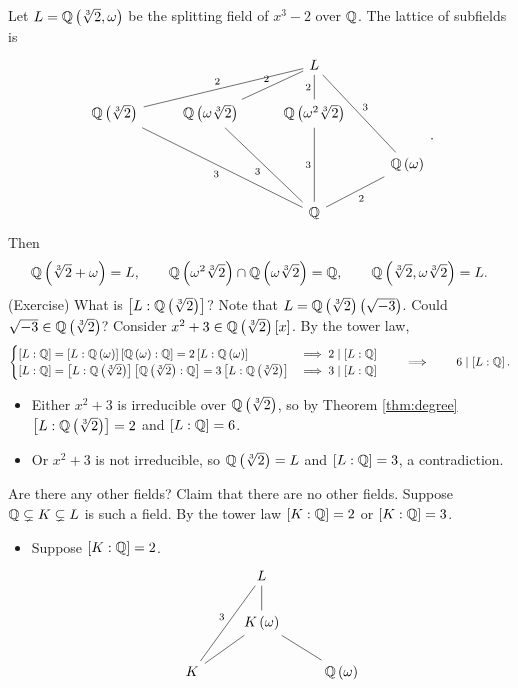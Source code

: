 \begin{example*}
Let $ L = \Q\rb{\sqrt[3]{2}, \omega} $ be the splitting field of $ x^3 - 2 $ over $ \Q $. The lattice of subfields is
$$
\begin{tikzcd}
& & L & \\
\Q\rb{\sqrt[3]{2}} \arrow[dash]{urr}{2} & \Q\rb{\omega\sqrt[3]{2}} \arrow[dash]{ur}{2} & \Q\rb{\omega^2\sqrt[3]{2}} \arrow[dash]{u}{2} & \\
& & & \Q\rb{\omega} \arrow[dash, swap]{uul}{3} \\
& & \Q \arrow[dash]{uull}{3} \arrow[dash]{uul}{3} \arrow[dash]{uu}{3} \arrow[dash, swap]{ur}{2} &
\end{tikzcd}.
$$
Then
$$ \Q\rb{\sqrt[3]{2} + \omega} = L, \qquad \Q\rb{\omega^2\sqrt[3]{2}} \cap \Q\rb{\omega\sqrt[3]{2}} = \Q, \qquad \Q\rb{\sqrt[3]{2}, \omega\sqrt[3]{2}} = L. $$
(Exercise) What is $ \sb{L : \Q\rb{\sqrt[3]{2}}} $? Note that $ L = \Q\rb{\sqrt[3]{2}}\rb{\sqrt{-3}} $. Could $ \sqrt{-3} \in \Q\rb{\sqrt[3]{2}} $? Consider $ x^2 + 3 \in \Q\rb{\sqrt[3]{2}}\sb{x} $. By the tower law,
$$
\begin{cases}
\sb{L : \Q} = \sb{L : \Q\rb{\omega}}\sb{\Q\rb{\omega} : \Q} = 2\sb{L : \Q\rb{\omega}} & \implies 2 \mid \sb{L : \Q} \\
\sb{L : \Q} = \sb{L : \Q\rb{\sqrt[3]{2}}}\sb{\Q\rb{\sqrt[3]{2}} : \Q} = 3\sb{L : \Q\rb{\sqrt[3]{2}}} & \implies 3 \mid \sb{L : \Q}
\end{cases}
\qquad \implies \qquad 6 \mid \sb{L : \Q}.
$$
\begin{itemize}
\item Either $ x^2 + 3 $ is irreducible over $ \Q\rb{\sqrt[3]{2}} $, so by Theorem \ref{thm:degree} $ \sb{L : \Q\rb{\sqrt[3]{2}}} = 2 $ and $ \sb{L : \Q} = 6 $.
\item Or $ x^2 + 3 $ is not irreducible, so $ \Q\rb{\sqrt[3]{2}} = L $ and $ \sb{L : \Q} = 3 $, a contradiction.
\end{itemize}
Are there any other fields? Claim that there are no other fields. Suppose $ \Q \subsetneq K \subsetneq L $ is such a field. By the tower law $ \sb{K : \Q} = 2 $ or $ \sb{K : \Q} = 3 $.
\begin{itemize}
\item Suppose $ \sb{K : \Q} = 2 $.
$$
\begin{tikzcd}
& L & \\
& K\rb{\omega} \arrow[dash]{u} & \\
K \arrow[dash]{uur}{3} \arrow[dash]{ur} & & \Q\rb{\omega} \arrow[dash]{ul} \\

\end{tikzcd}$$
\end{itemize}
\end{example*}

